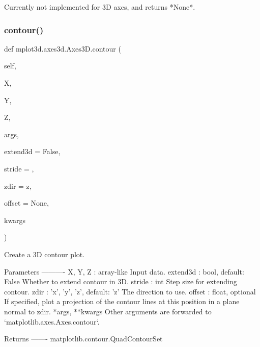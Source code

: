 \begin{DoxyVerb}Currently not implemented for 3D axes, and returns *None*.\end{DoxyVerb}
 \mbox{\label{classmplot3d_1_1axes3d_1_1Axes3D_a983c5966ebf379b8100d156f4e5672ee}} 
\subsubsection{\texorpdfstring{contour()}{contour()}}
{\footnotesize\ttfamily def mplot3d.\+axes3d.\+Axes3\+D.\+contour (\begin{DoxyParamCaption}\item[{}]{self,  }\item[{}]{X,  }\item[{}]{Y,  }\item[{}]{Z,  }\item[{}]{args,  }\item[{}]{extend3d = {\ttfamily False},  }\item[{}]{stride = {},  }\item[{}]{zdir = {\ttfamily \textquotesingle{}z\textquotesingle{}},  }\item[{}]{offset = {\ttfamily None},  }\item[{}]{kwargs }\end{DoxyParamCaption})}

\begin{DoxyVerb}Create a 3D contour plot.

Parameters
----------
X, Y, Z : array-like
    Input data.
extend3d : bool, default: False
    Whether to extend contour in 3D.
stride : int
    Step size for extending contour.
zdir : {'x', 'y', 'z'}, default: 'z'
    The direction to use.
offset : float, optional
    If specified, plot a projection of the contour lines at this
    position in a plane normal to zdir.
*args, **kwargs
    Other arguments are forwarded to `matplotlib.axes.Axes.contour`.

Returns
-------
matplotlib.contour.QuadContourSet
\end{DoxyVerb}
 \mbox{\label{classmplot3d_1_1axes3d_1_1Axes3D_a2ce6fa375e8327b859a127ab9dfc36ad}} 
